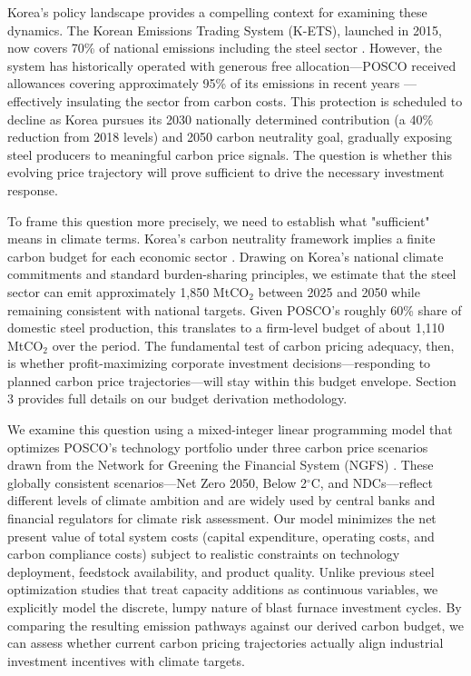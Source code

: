 Korea's policy landscape provides a compelling context for examining these dynamics. The Korean Emissions Trading System (K-ETS), launched in 2015, now covers 70\% of national emissions including the steel sector \citep{kim2021kets}. However, the system has historically operated with generous free allocation—POSCO received allowances covering approximately 95\% of its emissions in recent years \citep{ICAP2024}—effectively insulating the sector from carbon costs. This protection is scheduled to decline as Korea pursues its 2030 nationally determined contribution (a 40\% reduction from 2018 levels) and 2050 carbon neutrality goal, gradually exposing steel producers to meaningful carbon price signals. The question is whether this evolving price trajectory will prove sufficient to drive the necessary investment response.

To frame this question more precisely, we need to establish what "sufficient" means in climate terms. Korea's carbon neutrality framework implies a finite carbon budget for each economic sector \citep{korea2020carbon}. Drawing on Korea's national climate commitments and standard burden-sharing principles, we estimate that the steel sector can emit approximately 1,850 MtCO$_2$ between 2025 and 2050 while remaining consistent with national targets. Given POSCO's roughly 60\% share of domestic steel production, this translates to a firm-level budget of about 1,110 MtCO$_2$ over the period. The fundamental test of carbon pricing adequacy, then, is whether profit-maximizing corporate investment decisions—responding to planned carbon price trajectories—will stay within this budget envelope. Section 3 provides full details on our budget derivation methodology.

We examine this question using a mixed-integer linear programming model that optimizes POSCO's technology portfolio under three carbon price scenarios drawn from the Network for Greening the Financial System (NGFS) \citep{NGFS2024}. These globally consistent scenarios—Net Zero 2050, Below 2$^\circ$C, and NDCs—reflect different levels of climate ambition and are widely used by central banks and financial regulators for climate risk assessment. Our model minimizes the net present value of total system costs (capital expenditure, operating costs, and carbon compliance costs) subject to realistic constraints on technology deployment, feedstock availability, and product quality. Unlike previous steel optimization studies that treat capacity additions as continuous variables, we explicitly model the discrete, lumpy nature of blast furnace investment cycles. By comparing the resulting emission pathways against our derived carbon budget, we can assess whether current carbon pricing trajectories actually align industrial investment incentives with climate targets.

